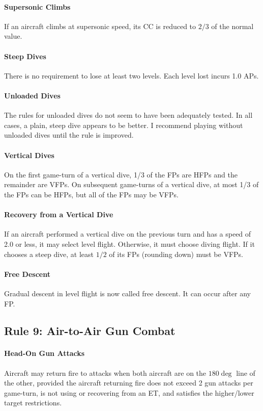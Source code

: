 \documentclass[10pt]{article}
\begin{document}
\paragraph{Supersonic Climbs} If an aircraft climbs at supersonic speed, its CC is reduced to $2/3$ of the normal value.

\paragraph{Steep Dives} There is no requirement to lose at least two levels. Each level lost incurs 1.0 APs.

\paragraph{Unloaded Dives} The rules for unloaded dives do not seem to have been adequately tested. In all cases, a plain, steep dive appears to be better. I recommend playing without unloaded dives until the rule is improved.

\paragraph{Vertical Dives} On the first game-turn of a vertical dive, 1/3 of the FPs are HFPs and the remainder are VFPs. On subsequent game-turns of a vertical dive, at most 1/3 of the FPs can be HFPs, but all of the FPs may be VFPs.

\paragraph{Recovery from a Vertical Dive} If an aircraft performed a vertical dive on the previous turn and has a speed of 2.0 or less, it may select level flight. Otherwise, it must choose diving flight. If it chooses a steep dive, at least $1/2$ of its FPs (rounding down) must be VFPs.

\paragraph{Free Descent} Gradual descent in level flight is now called free descent. It can occur after any FP.

\subsection{Rule 9: Air-to-Air Gun Combat}

\paragraph{Head-On Gun Attacks} Aircraft may return fire to attacks when both aircraft are on the $180\deg$ line of the other, provided the aircraft returning fire does not exceed 2 gun attacks per game-turn, is not using or recovering from an ET, and satisfies the higher/lower target restrictions.
\end{document}
